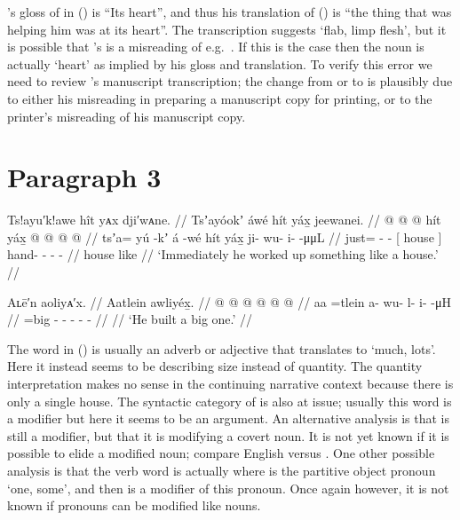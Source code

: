 \citeauthor{swanton:1909}’s gloss of  in (\lastx) is “Its heart”, and thus his translation of (\lastx) is “the thing that was helping him was at its heart”.
The transcription suggests  ‘flab, limp flesh’, but it is possible that \citeauthor{swanton:1909}’s  is a misreading of e.g.\ .
If this is the case then the noun is actually  ‘heart’ as implied by his gloss and translation.
To verify this error we need to review \citeauthor{swanton:1909}’s manuscript transcription; the change from  or  to  is plausibly due to either his misreading in preparing a manuscript copy for printing, or to the printer’s misreading of his manuscript copy.

\section{Paragraph 3}\label{sec:90-para-3}

\ex\label{ex:90-37-work-like-house}%
%
\begingl
	\glpreamble	Ts!ayu′k!awe hît yᴀx dji′wᴀne. //
	\glpreamble	Tsʼayóokʼ áwé hít yáx̱ jeewanei. //
	\gla	{} @ {} @ {}  @ {} 
		{} hít yáx̱ {}
		 @ {} @ {} @ {} @ {} //
	\glb	tsʼa= yú -kʼ á -wé
		{} hít yáx̱ {}
		ji- wu- i-  -μμL //
	\glc	just=  -  -
		{}[ house  {}]
		hand- - -  - //
	\gld	{} {} {}  {}
		{} house like {}
		 {} {} {} {} //
	\glft	‘Immediately he worked up something like a house.’
		//
\endgl
\xe


\ex\label{ex:90-38-built-big-one}%
%
\begingl
	\glpreamble	Aʟē′n aoliyᴀ′x. //
	\glpreamble	Aatlein awliyéx̱. //
	\gla	{} @ {}
		 @ {} @ {} @ {} @ {} @ {} //
	\glb	aa =tlein
		a- wu- l- i-  -μH //
	\glc	{} =big
		- - - -  - //
	\gld	{} {}
		 {} {} {} {} {} //
	\glft	‘He built a big one.’
		//
\endgl
\xe

The word  in (\lastx) is usually an adverb or adjective that translates to ‘much, lots’.
Here it instead seems to be describing size instead of quantity.
The quantity interpretation makes no sense in the continuing narrative context because there is only a single house.
The syntactic category of  is also at issue; usually this word is a modifier but here it seems to be an argument.
An alternative analysis is that  is still a modifier, but that it is modifying a covert noun.
It is not yet known if it is possible to elide a modified noun; compare English  versus .
One other possible analysis is that the verb word is actually  where  is the partitive object pronoun ‘one, some’, and then  is a modifier of this pronoun.
Once again however, it is not known if pronouns can be modified like nouns.

